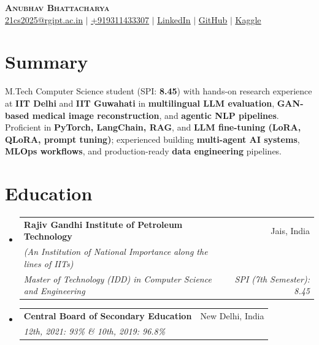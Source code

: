 \documentclass[a4paper, 11pt]{article}
\makeatletter
\newcommand{\resumeSubheading}[4]{
  \vspace{-2pt}\item
  \begin{tabular*}{0.97\textwidth}{l@{\extracolsep{\fill}}r}
    \textbf{#1} & #2 \\
    \textit{\small#3} & \textit{\small #4} \\
  \end{tabular*}\vspace{-7pt}
}
\newcommand{\resumeSubheadingb}[6]{
  \vspace{-2pt}\item
  \begin{tabular*}{0.97\textwidth}{l@{\extracolsep{\fill}}r}
    \textbf{#1} & #2 \\
    \textit{\scriptsize(#3)} & \textit{\scriptsize #4} \\ \vspace{2pt} %
    \textit{\small#5} & \textit{\small #6} \\
  \end{tabular*}\vspace{-7pt}
}
\newcommand{\resumeSubHeadingListStart}{\begin{itemize}[leftmargin=*,
      label={}]}
\newcommand{\resumeSubHeadingListEnd}{\end{itemize}}
\makeatother
\begin{document}
\begin{center}
  \textbf{\Huge \scshape Anubhav Bhattacharya} \\ \vspace{1pt}
  \href{mailto:21cs2025@rgipt.ac.in}{\underline{21cs2025@rgipt.ac.in}}
  $|$
   \small
  \href{tel:+919311433307}{\underline{+919311433307}} $|$
  \href{https://www.linkedin.com/in/anubhav-bhattacharya-b463ab23a/}{\underline{LinkedIn}} $|$
  \href{https://github.com/AnubhavBhattachayra}{\underline{GitHub}} $|$
  \href{https://www.kaggle.com/oatmealnavigator}{\underline{Kaggle }}
  
\end{center}
\section{Summary}
\small{
  M.Tech Computer Science student (SPI: \textbf{8.45}) with hands-on research experience at \textbf{IIT Delhi} and \textbf{IIT Guwahati} in \textbf{multilingual LLM evaluation}, \textbf{GAN-based medical image reconstruction}, and \textbf{agentic NLP pipelines}. Proficient in \textbf{PyTorch, LangChain, RAG}, and \textbf{LLM fine-tuning (LoRA, QLoRA, prompt tuning)}; experienced building \textbf{multi-agent AI systems}, \textbf{MLOps workflows}, and production-ready \textbf{data engineering} pipelines.
}
\section{Education}
\resumeSubHeadingListStart

    \resumeSubheadingb
      {Rajiv Gandhi Institute of Petroleum Technology}{Jais, India}
      {An Institution of National Importance along the lines of IITs}{}
      {Master of Technology (IDD) in Computer Science and Engineering}{SPI (7th Semester): 8.45}

    \vspace{4pt} 

    \resumeSubheading
      {Central Board of Secondary Education}{New Delhi, India}
      {12th, 2021: 93\% \& 10th, 2019: 96.8\%}{}

\resumeSubHeadingListEnd


\end{document}
